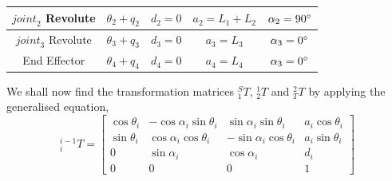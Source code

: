 \documentclass[a4paper]{article}
\begin{document}
\begin{qalist}
\begin{minipage}{\linewidth}
\begin{tabular}{|c|c|c|c|c|}
					\hline
					${joint}_{2}$ Revolute & ${\theta}_{2} + {q}_{2}$ & ${d}_{2} = 0$ & ${a}_{2} = {L}_{1} + {L}_{2}$ & ${\alpha}_{2} = 90\degree$\\
					\hline
					${joint}_{3}$ Revolute & ${\theta}_{3} + {q}_{3}$ & ${d}_{3} = 0$ & ${a}_{3} = {L}_{3}$ & ${\alpha}_{3} = 0 \degree$\\
					\hline
					End Effector & ${\theta}_{4} + {q}_{4}$ & ${d}_{4} = 0$ & ${a}_{4} = {L}_{4}$ & ${\alpha}_{3} = 0 \degree$\\
					\hline
				\end{tabular}
				\vspace{0.5cm}
			\end{minipage}	
			We shall now find the transformation matrices ${}^{S}_{1}T$, ${}^{1}_{2}T$ and ${}^{2}_{T}T$ by applying the generalised equation,
			\begin{equation}
				{}^{i-1}_{i}T = 
				\begin{bmatrix}
					\cos{\theta}_{i} & -\cos{\alpha}_{i}\sin{\theta}_{i} & \sin{\alpha}_{i}\sin{\theta}_{i} & {a}_{i}\cos{\theta}_{i} \\
					\sin{\theta}_{i} & \cos{\alpha}_{i}\cos{\theta}_{i} & -\sin{\alpha}_{i}\cos{\theta}_{i} & {a}_{i}\sin{\theta}_{i} \\
					0 & \sin{\alpha}_{i} & \cos{\alpha}_{i} & {d}_{i} \\
					0 & 0 & 0 & 1
				\end{bmatrix}
			\end{equation}
			
			

\end{qalist}
\end{document}

